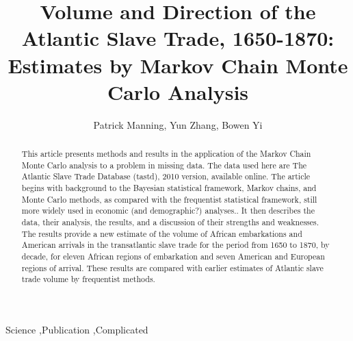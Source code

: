 \documentclass[preprint,12pt]{elsarticle}
\begin{document}
\begin{frontmatter}


\title{Volume and Direction of the Atlantic Slave Trade, 1650-1870:
Estimates by Markov Chain Monte Carlo Analysis
}




\author{Patrick Manning, Yun Zhang, Bowen Yi}

\address{}

\begin{abstract}
This article presents methods and results in the application of the Markov Chain Monte Carlo analysis to a problem in missing data. The data used here are The Atlantic Slave Trade Database (tastd), 2010 version, available online.  The article begins with background to the Bayesian statistical framework, Markov chains, and Monte Carlo methods, as compared with the frequentist statistical framework, still more widely used in economic (and demographic?) analyses.. It then describes the data, their analysis, the results, and a discussion of their strengths and weaknesses. The results provide a new estimate of the volume of African embarkations and American arrivals in the transatlantic slave trade for the period from 1650 to 1870, by decade, for eleven African regions of embarkation and seven  American and European regions of arrival. These results are compared with earlier estimates of Atlantic slave trade volume by frequentist methods. 
\end{abstract}

\begin{keyword}
Science \sep Publication \sep Complicated


\end{keyword}

\end{frontmatter}
\end{document}
